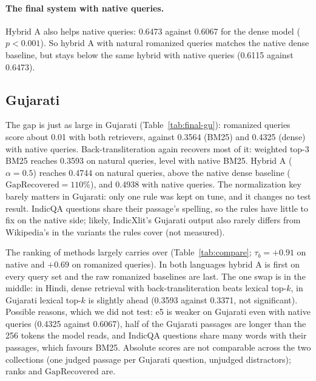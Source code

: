 \documentclass[11pt,a4paper]{article}
\newcommand{\gr}{\mathrm{GapRecovered}}
\begin{document}
\paragraph{The final system with native queries.} Hybrid A also helps native queries: 0.6473
against 0.6067 for the dense model ($p < 0.001$). So hybrid A with natural romanized queries
matches the native dense baseline, but stays below the same hybrid with native queries (0.6115
against 0.6473).

\subsection{Gujarati}

\begin{table}[H]
\centering
\caption{Gujarati test results (500 queries), nDCG@10, marks as in Table~\ref{tab:final-hi}
(Bonferroni over 23 comparisons). Every setting was re-chosen on the Gujarati tune split.}
\label{tab:final-gu}
\small

\end{table}

The gap is just as large in Gujarati (Table~\ref{tab:final-gu}): romanized queries score about
0.01 with both retrievers, against 0.3564 (BM25) and 0.4325 (dense) with native queries.
Back-transliteration again recovers most of it: weighted top-3 BM25 reaches 0.3593 on natural
queries, level with native BM25. Hybrid A ($\alpha = 0.5$) reaches 0.4744 on natural queries,
above the native dense baseline ($\gr = 110\%$), and 0.4938 with native queries. The
normalization key barely matters in Gujarati: only one rule was kept on tune, and it changes
no test result. IndicQA questions share their passage's spelling, so the rules have little to
fix on the native side; likely, IndicXlit's Gujarati output also rarely differs from
Wikipedia's in the variants the rules cover (not measured).

\begin{table}[H]
\centering
\caption{The same methods in both languages: nDCG@10 on test (rank within the language in
brackets) and Kendall's $\tau_b$ between the two rankings. Generated by
\texttt{scripts/compare\_languages.py}.}
\label{tab:compare}
\small
\resizebox{\textwidth}{!}{}
\end{table}

The ranking of methods largely carries over (Table~\ref{tab:compare}; $\tau_b = +0.91$ on
native and $+0.69$ on romanized queries). In both languages hybrid A is first on every query
set and the raw romanized baselines are last. The one swap is in the middle: in Hindi, dense
retrieval with back-transliteration beats lexical top-$k$, in Gujarati lexical top-$k$ is
slightly ahead (0.3593 against 0.3371, not significant). Possible reasons, which we did not
test: e5 is weaker on Gujarati even with native queries (0.4325 against 0.6067), half of the
Gujarati passages are longer than the 256 tokens the model reads, and IndicQA questions share
many words with their passages, which favours BM25. Absolute scores are not comparable
across the two collections (one judged passage per Gujarati question, unjudged distractors);
ranks and $\gr$ are.
\end{document}
